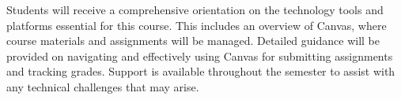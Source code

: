 Students will receive a comprehensive orientation on the technology tools
and platforms essential for this course. This includes an overview of Canvas,
where course materials and assignments will be managed. Detailed guidance
will be provided on navigating and effectively using Canvas for submitting
assignments and tracking grades. Support is available throughout the semester
to assist with any technical challenges that may arise.
